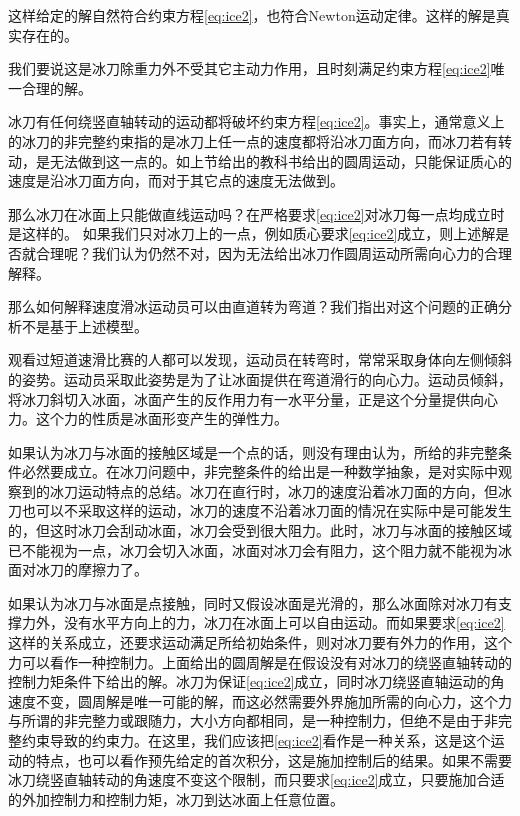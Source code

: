 \documentclass{ctexart}
\begin{document}
这样给定的解自然符合约束方程\eqref{eq:ice2}，也符合Newton运动定律。这样的解是真实存在的。

我们要说这是冰刀除重力外不受其它主动力作用，且时刻满足约束方程\eqref{eq:ice2}唯一合理的解。

冰刀有任何绕竖直轴转动的运动都将破坏约束方程\eqref{eq:ice2}。事实上，通常意义上的冰刀的非完整约束指的是冰刀上任一点的速度都将沿冰刀面方向，而冰刀若有转动，是无法做到这一点的。如上节给出的教科书给出的圆周运动，只能保证质心的速度是沿冰刀面方向，而对于其它点的速度无法做到。

那么冰刀在冰面上只能做直线运动吗？在严格要求\eqref{eq:ice2}对冰刀每一点均成立时是这样的。
如果我们只对冰刀上的一点，例如质心要求\eqref{eq:ice2}成立，则上述解是否就合理呢？我们认为仍然不对，因为无法给出冰刀作圆周运动所需向心力的合理解释。

那么如何解释速度滑冰运动员可以由直道转为弯道？我们指出对这个问题的正确分析不是基于上述模型。


观看过短道速滑比赛的人都可以发现，运动员在转弯时，常常采取身体向左侧倾斜的姿势。运动员采取此姿势是为了让冰面提供在弯道滑行的向心力。运动员倾斜，将冰刀斜切入冰面，冰面产生的反作用力有一水平分量，正是这个分量提供向心力。这个力的性质是冰面形变产生的弹性力。


如果认为冰刀与冰面的接触区域是一个点的话，则没有理由认为，所给的非完整条件必然要成立。在冰刀问题中，非完整条件的给出是一种数学抽象，是对实际中观察到的冰刀运动特点的总结。冰刀在直行时，冰刀的速度沿着冰刀面的方向，但冰刀也可以不采取这样的运动，冰刀的速度不沿着冰刀面的情况在实际中是可能发生的，但这时冰刀会刮动冰面，冰刀会受到很大阻力。此时，冰刀与冰面的接触区域已不能视为一点，冰刀会切入冰面，冰面对冰刀会有阻力，这个阻力就不能视为冰面对冰刀的摩擦力了。

如果认为冰刀与冰面是点接触，同时又假设冰面是光滑的，那么冰面除对冰刀有支撑力外，没有水平方向上的力，冰刀在冰面上可以自由运动。而如果要求\eqref{eq:ice2}这样的关系成立，还要求运动满足所给初始条件，则对冰刀要有外力的作用，这个力可以看作一种控制力。上面给出的圆周解是在假设没有对冰刀的绕竖直轴转动的控制力矩条件下给出的解。冰刀为保证\eqref{eq:ice2}成立，同时冰刀绕竖直轴运动的角速度不变，圆周解是唯一可能的解，而这必然需要外界施加所需的向心力，这个力与所谓的非完整力或跟随力，大小方向都相同，是一种控制力，但绝不是由于非完整约束导致的约束力。在这里，我们应该把\eqref{eq:ice2}看作是一种关系，这是这个运动的特点，也可以看作预先给定的首次积分，这是施加控制后的结果。如果不需要冰刀绕竖直轴转动的角速度不变这个限制，而只要求\eqref{eq:ice2}成立，只要施加合适的外加控制力和控制力矩，冰刀到达冰面上任意位置。
\end{document}
